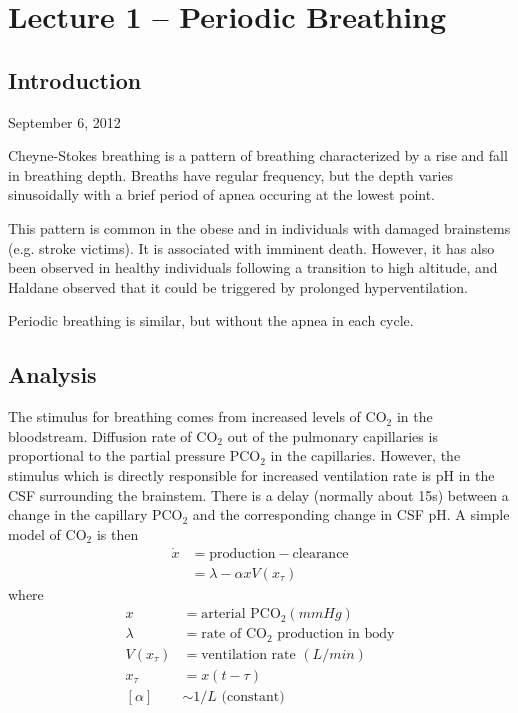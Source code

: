 \section{Lecture 1 -- Periodic Breathing}

\subsection{Introduction}
September 6, 2012

Cheyne-Stokes breathing is a pattern of breathing characterized by a rise and fall in breathing depth. Breaths have regular frequency, but the depth varies sinusoidally with a brief period of apnea occuring at the lowest point.

This pattern is common in the obese and in individuals with damaged brainstems (e.g. stroke victims). It is associated with imminent death. However, it has also been observed in healthy individuals following a transition to high altitude, and Haldane observed that it could be triggered by prolonged hyperventilation.

Periodic breathing is similar, but without the apnea in each cycle.

\subsection{Analysis}

The stimulus for breathing comes from increased levels of $\mathrm{CO}_2$ in the bloodstream. Diffusion rate of $\mathrm{CO}_2$ out of the pulmonary capillaries is proportional to the partial pressure $\mathrm{PCO}_2$ in the capillaries. However, the stimulus which is directly responsible for increased ventilation rate is pH in the CSF surrounding the brainstem. There is a delay (normally about 15s) between a change in the capillary $\mathrm{PCO}_2$ and the corresponding change in CSF pH. A simple model of $\mathrm{CO}_2$ is then 
\begin{align}
  \dot{x} &=\text{production}-\text{clearance}\nonumber \\ &= \lambda - \alpha xV(x_\tau)
  \label{eq:xdot}
\end{align}
where
\begin{align*}
  x &= \text{arterial PCO}_2 (mmHg)\\
  \lambda &= \text{rate of CO}_2\text{ production in body}\\
  V(x_\tau) &= \text{ventilation rate }(L/min)\\
  x_\tau &= x(t-\tau)\\
  [\alpha] &\sim 1/L \text{ (constant)}
\end{align*}


